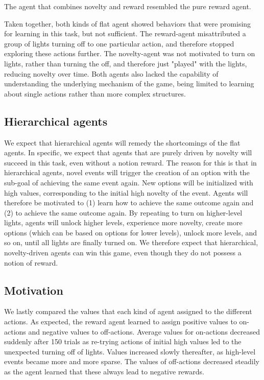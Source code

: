 \documentclass{article}
\begin{document}
The agent that combines novelty and reward resembled the pure reward agent. 

Taken together, both kinds of flat agent showed behaviors that were promising for learning in this task, but not sufficient. The reward-agent misattributed a group of lights turning off to one particular action, and therefore stopped exploring these actions further. The novelty-agent was not motivated to turn on lights, rather than turning the off, and therefore just "played" with the lights, reducing novelty over time. Both agents also lacked the capability of understanding the underlying mechanism of the game, being limited to learning about single actions rather than more complex structures. 


\subsection{Hierarchical agents}

We expect that hierarchical agents will remedy the shortcomings of the flat agents. In specific, we expect that agents that are purely driven by novelty will succeed in this task, even without a notion reward. The reason for this is that in hierarchical agents, novel events will trigger the creation of an option with the sub-goal of achieving the same event again. New options will be initialized with high values, corresponding to the initial high novelty of the event. Agents will therefore be motivated to (1) learn how to achieve the same outcome again and (2) to achieve the same outcome again. By repeating to turn on higher-level lights, agents will unlock higher levels, experience more novelty, create more options (which can be based on options for lower levels), unlock more levels, and so on, until all lights are finally turned on. We therefore expect that hierarchical, novelty-driven agents can win this game, even though they do not possess a notion of reward.


\subsection{Motivation}

We lastly compared the values that each kind of agent assigned to the different actions. As expected, the reward agent learned to assign positive values to on-actions and negative values to off-actions. Average values for on-actions decreased suddenly after 150 trials as re-trying actions of initial high values led to the unexpected turning off of lights. Values increased slowly thereafter, as high-level events became more and more sparse. The values of off-actions decreased steadily as the agent learned that these always lead to negative rewards.
\end{document}

